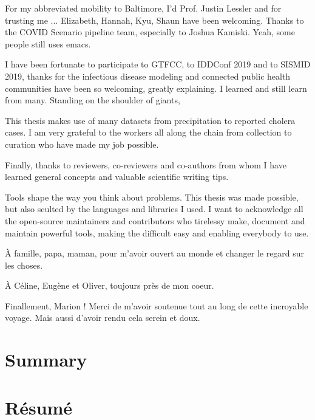  
 For my abbreviated mobility to Baltimore, I'd Prof. Justin Lessler and for trusting me  ... Elizabeth, Hannah, Kyu, Shaun have been welcoming. Thanks to the COVID Scenario pipeline team, especially to Joshua Kamiski. Yeah, some people still uses emacs.
 
 I have been fortunate to participate to GTFCC, to IDDConf 2019 and to SISMID 2019, thanks for the infectious disease modeling and connected public health communities have been so welcoming, greatly explaining. I learned and still learn from many. Standing on the shoulder of giants, 
 
 This thesis makes use of many datasets from precipitation to reported cholera cases. I am very grateful to the workers all along the chain from collection to curation who have made my job possible.
 
 Finally, thanks to reviewers, co-reviewers and co-authors from whom I have learned general concepts and valuable scientific writing tips.
 
Tools shape the way you think about problems. This thesis was made possible, but also sculted by the languages and libraries I used. I want to acknowledge all the open-source maintainers and contributors who tirelessy make, document and maintain powerful tools, making the difficult easy and enabling everybody to use.

À famille, papa, maman, pour m'avoir ouvert au monde et changer le regard sur les choses.

À Céline, Eugène et Oliver, toujours près de mon coeur. %

Finallement, Marion ! Merci de m'avoir soutenue tout au long de cette incroyable voyage. Mais aussi d'avoir rendu cela serein et doux. 
 
 \chapter{Summary}
 
 \chapter{Résumé}
